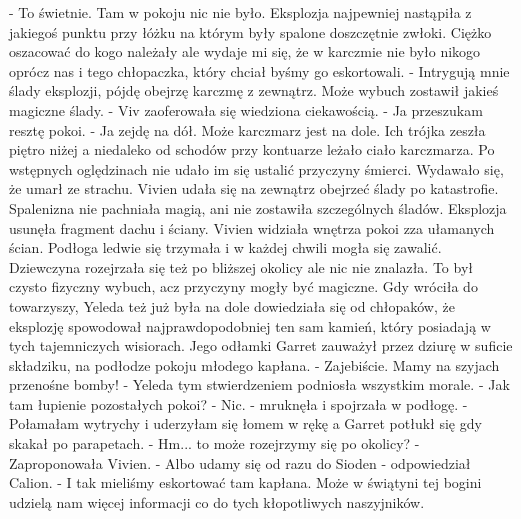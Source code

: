\documentclass[10pt,twoside,twocolumn]{book}
\begin{document}
\indent - To świetnie. Tam w pokoju nic nie było. Eksplozja najpewniej nastąpiła z jakiegoś punktu przy łóżku na którym były spalone doszczętnie zwłoki. Ciężko oszacować do kogo należały ale wydaje mi się, że w karczmie nie było nikogo oprócz nas i tego chłopaczka, który chciał byśmy go eskortowali.\newline
\indent - Intrygują mnie ślady eksplozji, pójdę obejrzę karczmę z zewnątrz. Może wybuch zostawił jakieś magiczne ślady. - Viv zaoferowała się wiedziona ciekawością.\newline
\indent - Ja przeszukam resztę pokoi.\newline
\indent - Ja zejdę na dół. Może karczmarz jest na dole.\newline
Ich trójka zeszła piętro niżej a niedaleko od schodów przy kontuarze leżało ciało karczmarza. 
Po wstępnych oględzinach nie udało im się ustalić przyczyny śmierci. 
Wydawało się, że umarł ze strachu.
Vivien udała się na zewnątrz obejrzeć ślady po katastrofie. 
Spalenizna nie pachniała magią, ani nie zostawiła szczególnych śladów. 
Eksplozja usunęła fragment dachu i ściany. 
Vivien widziała wnętrza pokoi zza ułamanych ścian. 
Podłoga ledwie się trzymała i w każdej chwili mogła się zawalić. 
Dziewczyna rozejrzała się też po bliższej okolicy ale nic nie znalazła. 
To był czysto fizyczny wybuch, acz przyczyny mogły być magiczne.
Gdy wróciła do towarzyszy, Yeleda też już była na dole dowiedziała się od chłopaków, że eksplozję spowodował najprawdopodobniej ten sam kamień, który posiadają w tych tajemniczych wisiorach. 
Jego odłamki Garret zauważył przez dziurę w suficie składziku, na podłodze pokoju młodego kapłana.\newline
\indent - Zajebiście. Mamy na szyjach przenośne bomby! - Yeleda tym stwierdzeniem podniosła wszystkim morale.\newline
\indent - Jak tam łupienie pozostałych pokoi?\newline
\indent - Nic. - mruknęła i spojrzała w podłogę. - Połamałam wytrychy i uderzyłam się łomem w rękę a Garret potłukł się gdy skakał po parapetach.\newline
\indent - Hm... to może rozejrzymy się po okolicy? - Zaproponowała Vivien.\newline
\indent - Albo udamy się od razu do Sioden - odpowiedział Calion. - I tak mieliśmy eskortować tam kapłana. Może w świątyni tej bogini udzielą nam więcej informacji co do tych kłopotliwych naszyjników.
\end{document}
